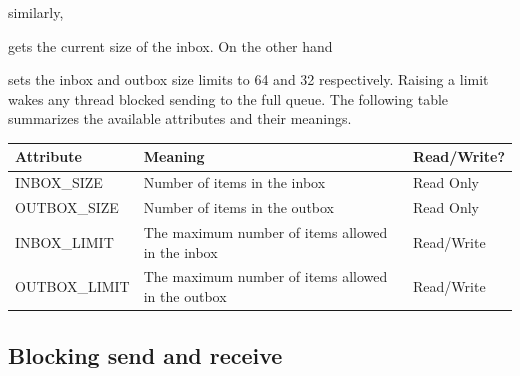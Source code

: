 
\noindent similarly, 


\noindent
gets the current size of the inbox. On the other hand

\noindent sets the inbox and outbox size limits to 64 and 32 respectively.
Raising a limit wakes any thread blocked sending to the full queue.
The following table summarizes the available attributes and their meanings.


\begin{flushleft}
\begin{tabular}{p{1.6in} p{2.8in} p{1.5in}}
 Attribute & Meaning & Read/Write?\\
\hline
INBOX\_SIZE &
Number of items in the inbox &
Read Only\\
OUTBOX\_SIZE &
Number of items in the outbox &
Read Only\\
INBOX\_LIMIT &
The maximum number of items allowed in the inbox &
Read/Write\\
OUTBOX\_LIMIT &
The maximum number of items allowed in the outbox &
Read/Write\\
\end{tabular}
\end{flushleft}

\subsection*{Blocking send and receive}

